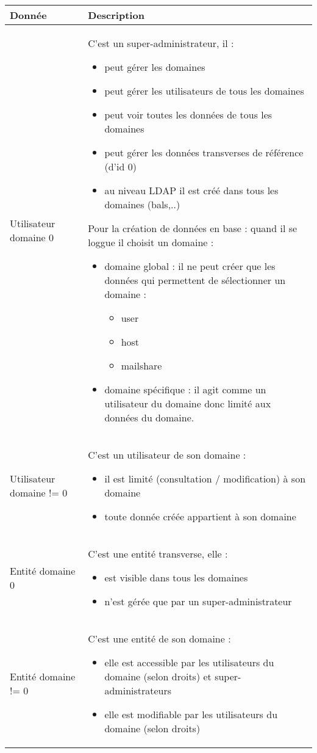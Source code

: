 \begin{tabular}{|p{4cm}|p{10cm}|}
\hline
\textbf{Donnée} & \textbf{Description}\\
\hline
Utilisateur domaine 0 & C'est un super-administrateur, il :
\begin{itemize}
\item peut gérer les domaines
\item peut gérer les utilisateurs de tous les domaines
\item peut voir toutes les données de tous les domaines
\item peut gérer les données transverses de référence (d'id 0)
\item au niveau LDAP il est créé dans tous les domaines (bals,..)
\end{itemize}
\vspace{0.3cm}

Pour la création de données en base : quand il se loggue il choisit un domaine :
\begin{itemize}
\item domaine global : il ne peut créer que les données qui permettent de sélectionner un domaine :
  \begin{itemize}
  \item user
  \item host
  \item mailshare
  \end{itemize}
\item domaine spécifique : il agit comme un utilisateur du domaine donc limité aux données du domaine.
\end{itemize}

\\
\hline
Utilisateur domaine != 0 & C'est un utilisateur de son domaine :
\begin{itemize}
\item il est limité (consultation / modification) à son domaine
\item toute donnée créée appartient à son domaine
\end{itemize}
\\
\hline
Entité domaine 0 & C'est une entité transverse, elle :
\begin{itemize}
\item est visible dans tous les domaines
\item n'est gérée que par un super-administrateur
\end{itemize}
\\
\hline
Entité domaine != 0 & C'est une entité de son domaine :
\begin{itemize}
\item elle est accessible par les utilisateurs du domaine (selon droits) et super-administrateurs
\item elle est modifiable par les utilisateurs du domaine (selon droits)
\end{itemize}
\\
\hline
\end{tabular}
\vspace{0.3cm}

